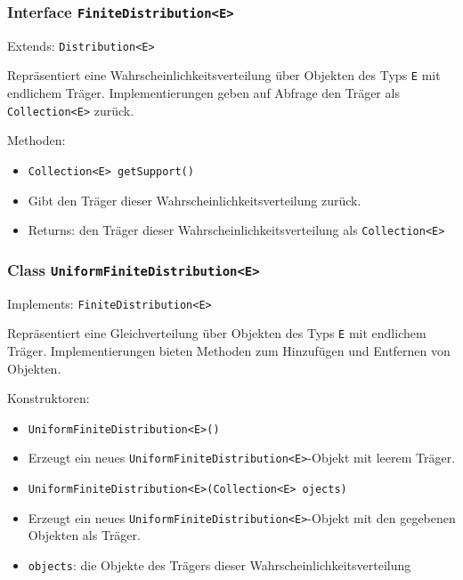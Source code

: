 \documentclass[parskip=full,11pt]{scrartcl}
\begin{document}
\subsubsection{Interface \texttt{FiniteDistribution<E>}}
Extends: \texttt{Distribution<E>}

Repräsentiert eine Wahrscheinlichkeitsverteilung über Objekten des Typs \texttt{E} mit endlichem Träger. Implementierungen geben auf Abfrage den Träger als \texttt{Collection<E>} zurück.

Methoden:
\begin{itemize}\itemsep -10pt
\item \texttt{Collection<E> getSupport()}
\item[] Gibt den Träger dieser Wahrscheinlichkeitsverteilung zurück.
\item[] Returns: den Träger dieser Wahrscheinlichkeitsverteilung als \texttt{Collection<E>}
\end{itemize}

\subsubsection{Class \texttt{UniformFiniteDistribution<E>}}
Implements: \texttt{FiniteDistribution<E>}

Repräsentiert eine Gleichverteilung über Objekten des Typs \texttt{E} mit endlichem Träger. Implementierungen bieten Methoden zum Hinzufügen und Entfernen von Objekten.

Konstruktoren:
\begin{itemize}\itemsep -10pt
\item \texttt{UniformFiniteDistribution<E>()}
\item[] Erzeugt ein neues \texttt{UniformFiniteDistribution<E>}-Objekt mit leerem Träger.

\item \texttt{UniformFiniteDistribution<E>(Collection<E> ojects)}
\item[] Erzeugt ein neues \texttt{UniformFiniteDistribution<E>}-Objekt mit den gegebenen Objekten als Träger.
\item[] \texttt{objects}: die Objekte des Trägers dieser Wahrscheinlichkeitsverteilung
\end{itemize}
\end{document}
